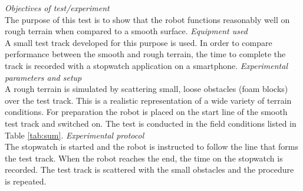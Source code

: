 \textit{Objectives of test/experiment}\\The purpose of this test is to show that the robot functions reasonably well on rough terrain when compared to a smooth surface.
\textit{Equipment used}\\
A small test track developed for this purpose is used. In order to compare performance between the smooth and rough terrain, the time to complete the track is recorded with a stopwatch application on a smartphone.
\textit{Experimental parameters and setup }\\
A rough terrain is simulated by scattering small, loose obstacles (foam blocks) over the test track. This is a realistic representation of a wide variety of terrain conditions. For preparation the robot is placed on the start line of the smooth test track and switched on. The test is conducted in the field conditions listed in Table \ref{tab:sum}.
\textit{Experimental protocol}\\
The stopwatch is started and the robot is instructed to follow the line that forms the test track. When the robot reaches the end, the time on the stopwatch is recorded. The test track is scattered with the small obstacles and the procedure is repeated.
